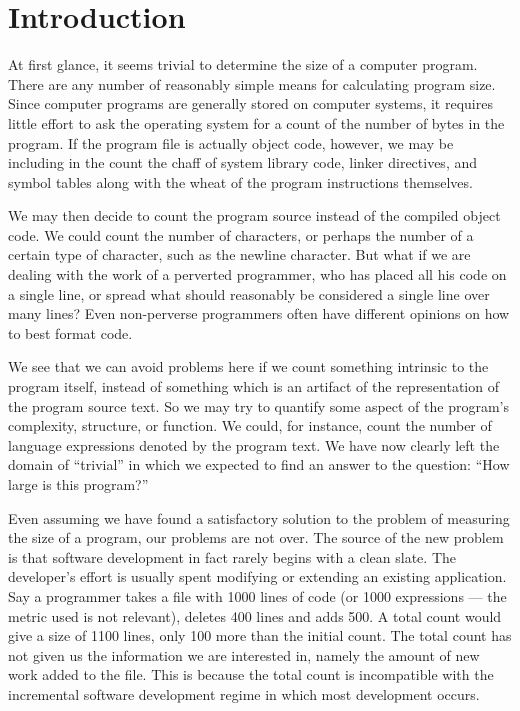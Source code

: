 
\chapter{Introduction}

At first glance, it seems trivial to determine the size of a computer
program.  There are any number of reasonably simple means for
calculating program size.  Since computer programs are generally
stored on computer systems, it requires little effort to ask the
operating system for a count of the number of bytes in the program.
If the program file is actually object code, however, we may be
including in the count the chaff of system library code, linker
directives, and symbol tables along with the wheat of the program
instructions themselves.

We may then decide to count the program source instead of the
compiled object code.  We could count the number of characters, or
perhaps the number of a certain type of character, such as the newline 
character.  But what if we are dealing with the work of a perverted
programmer, who has placed all his code on a single line, or spread
what should reasonably be considered a single line over many lines?  
Even non-perverse programmers often have different opinions on how to best
format code.

We see that we can avoid problems here if we count something intrinsic
to the program itself, instead of something which is an artifact of
the representation of the program source text.  So we may try to
quantify some aspect of the program's complexity, structure, or
function.  We could, for instance, count the number of language
expressions denoted by the program text.  We have now clearly left the
domain of ``trivial'' in which we expected to find an answer to the
question: ``How large is this program?''

Even assuming we have found a satisfactory solution to the problem of
measuring the size of a program, our problems are not over.  The source of
the new problem is that software development in fact rarely begins with a
clean slate.  The developer's effort is usually spent modifying or
extending an existing application.  Say a programmer takes a file with 1000
lines of code (or 1000 expressions --- the metric used is not relevant),
deletes 400 lines and adds 500.  A total count would give a size of 1100
lines, only 100 more than the initial count.  The total count has not given
us the information we are interested in, namely the amount of new work
added to the file.  This is because the total count is incompatible with
the incremental software development regime in which most development
occurs.

